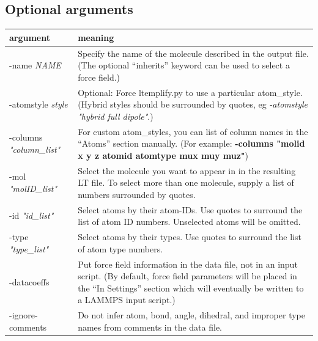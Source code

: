\documentclass[11pt]{article}
\begin{document}
\subsection{ Optional arguments }
\label{sec:ltemplify_args_table}
\begin{tabular}[h]{l|p{10cm}}
\textbf{argument} & \textbf{meaning}
\\
\hline
\hline

-name \textit{NAME}  &
Specify the name of the molecule described in the output file.
(The optional ``inherits'' keyword can be used to select a force field.)
\\
\hline

-atomstyle \textit{style}
&
Optional: Force ltemplify.py to use a particular atom\_style.
(Hybrid styles should be surrounded by quotes, eg
\textit{-atomstyle "hybrid full dipole"}.)
\\
\hline

-columns \textit{"column\_list"}  &
For custom atom\_styles, you can list of column names in the ``Atoms''
section manually.
(For example: \textbf{-columns "molid x y z atomid atomtype mux muy muz"})
\\
\hline

-mol \textit{"molID\_list"}
&
Select the molecule you want to appear in in the resulting LT file.
To select more than one molecule, supply a list of numbers surrounded
by quotes.
\\
\hline

-id \textit{"id\_list"}
&
Select atoms by their atom-IDs.
Use quotes to surround the list of atom ID numbers.
Unselected atoms will be omitted.
\\
\hline

-type \textit{"type\_list"}
&
Select atoms by their types.
Use quotes to surround the list of atom type numbers.
\\
\hline

-datacoeffs
&
Put force field information in the data file, not in an input script.
(By default, force field parameters will be placed in the ``In Settings''
 section which will eventually be written to a LAMMPS input script.)
\\
\hline

-ignore-comments
&
Do not infer atom, bond, angle, dihedral, and improper type names
from comments in the data file.
\\
\hline


\end{tabular}
\end{document}
